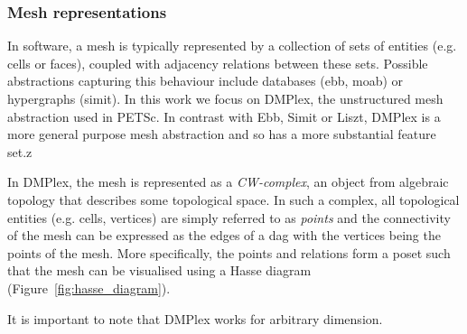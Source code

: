 
\subsubsection{Mesh representations}

In software, a mesh is typically represented by a collection of sets of entities (e.g. cells or faces), coupled with adjacency relations between these sets.
Possible abstractions capturing this behaviour include databases (ebb, moab) or hypergraphs (simit).
In this work we focus on DMPlex, the unstructured mesh abstraction used in PETSc.
In contrast with Ebb, Simit or Liszt, DMPlex is a more general purpose mesh abstraction and so has a more substantial feature set.z

In DMPlex, the mesh is represented as a \textit{CW-complex}, an object from algebraic topology that describes some topological space.
In such a complex, all topological entities (e.g. cells, vertices) are simply referred to as \textit{points} and the connectivity of the mesh can be expressed as the edges of a \gls{dag} with the vertices being the points of the mesh.
More specifically, the points and relations form a \gls{poset} such that the mesh can be visualised using a Hasse diagram (Figure~\ref{fig:hasse_diagram}).

It is important to note that DMPlex works for arbitrary dimension.

